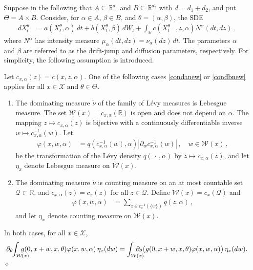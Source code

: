 \documentclass[11pt,a4paper]{article}
\newcommand{\RR}{{\mathbb R}}
\newcommand{\qq}{{\mathcal{Q}}}
\newcommand{\xx}{{\mathcal{X}}}
\newcommand{\ww}{{\mathcal{W}}}
\newcommand{\dqed}{{\leavevmode \unskip \penalty9999 \hbox{} \nobreak \hfill \quad \hbox{$\diamond$}}}
\numberwithin{equation}{section}
\numberwithin{theorem}{section}
\begin{document}
Suppose in the following that $A \subseteq \RR^{d_1}$ and $B\subseteq \RR^{d_2}$ with $d = d_1+d_2$, and put $\Theta = A\times B$. Consider, for $\alpha \in A$, $\beta \in B$, and $\theta = (\alpha,\beta)$, the SDE
\begin{align}
dX^\theta_t &= a(X^\theta_t, \alpha)\, dt + b(X^\theta_t, \beta)\, dW_t + \int_\RR c(X^\theta_{t-},z, \alpha) N^\alpha(dt, dz)\,,
\label{eqn:SDEoptimal2}
\end{align}
where $N^\alpha$ has intensity measure $\mu_\alpha(dt,dz) = \nu_\alpha(dz)\,dt$.
The parameters $\alpha$ and $\beta$ are referred to as the drift-jump and diffusion parameters, respectively. For simplicity, the following assumption is introduced.
%
\begin{assumption}
Let $c_{x, \alpha}(z) = c(x,z, \alpha)$. One of the following cases \ref{condanew} or \ref{condbnew} applies for all $x\in\xx$ and $\theta \in \Theta$.
\begin{enumerate}[label=(\alph{*}), ref=(\alph{*})]
\item\label{condanew} The dominating measure $\tilde{\nu}$ of the family of L\'evy   measures is Lebesgue measure. The set $\ww(x)  =  c_{x,\alpha}(\RR)$ is open and does not depend on $\alpha$. The mapping $z \mapsto c_{x, \alpha}(z)$ is bijective with a continuously differentiable inverse $w \mapsto c_{x, \alpha}^{-1}(w)$. Let
  \begin{align*} 
\varphi(x,w, \alpha) &= q(c_{x,\alpha}^{-1}(w), \alpha) |\partial_w c_{x,\alpha}^{-1}(w)|\,,\quad w \in \ww(x) \,,
\end{align*}
be the transformation of the L\'{e}vy density $q(\,\cdot\,, \alpha)$ by $z \mapsto  c_{x, \alpha}(z)$, and let $\eta_x$ denote Lebesgue measure on $\ww(x)$. 
\item\label{condbnew} The dominating measure $\tilde{\nu}$ is counting measure on an at most countable set $\qq \subset \RR$, and $c_{x,\alpha}(z) = c_x(z)$ for all $z\in \qq$. Define $\ww(x) = c_x(\qq)$ and
\begin{align*}
\varphi(x,w, \alpha) &= \sum_{z \in c_x^{-1}(\{w\})} q(z, \alpha)\,,
\end{align*}
and let $\eta_x$ denote counting measure on $\ww(x)$.
\end{enumerate}
In both cases, for all $x\in \xx$,
\[
\partial_\theta \hspace{-1mm}\int_{\ww(x)} \hspace{-5mm} g(0,x+w,x, \theta)\varphi(x,w,  \alpha)\,\eta_x(dw) = \int_{\ww(x)} \hspace{-5mm} \partial_\theta\big(                              g(0,x+w,x, \theta)\varphi(x,w, \alpha)\big)\, \eta_x(dw).
\]
\dqed
\label{assumptions_on_c} 
\end{assumption}
\end{document}
